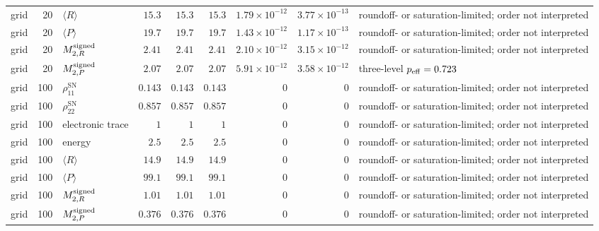 \documentclass[
  11pt,
  letterpaper,
  onehalfspacing,
  normalmargins,
  equalmargins,
  oneside
]{ut-thesis}
\begin{document}
\begin{landscape}
\begin{longtable}{l r l r r r r r L{0.18\textwidth}}
grid & 20 & $\langle R\rangle$ & $15.3$ & $15.3$ & $15.3$ & $1.79\times10^{-12}$ & $3.77\times10^{-13}$ & roundoff- or saturation-limited; order not interpreted \\
grid & 20 & $\langle P\rangle$ & $19.7$ & $19.7$ & $19.7$ & $1.43\times10^{-12}$ & $1.17\times10^{-13}$ & roundoff- or saturation-limited; order not interpreted \\
grid & 20 & $M^{\rm signed}_{2,R}$ & $2.41$ & $2.41$ & $2.41$ & $2.10\times10^{-12}$ & $3.15\times10^{-12}$ & roundoff- or saturation-limited; order not interpreted \\
grid & 20 & $M^{\rm signed}_{2,P}$ & $2.07$ & $2.07$ & $2.07$ & $5.91\times10^{-12}$ & $3.58\times10^{-12}$ & three-level $p_{\rm eff}=0.723$ \\
grid & 100 & $\rho_{11}^{\mathrm{SN}}$ & $0.143$ & $0.143$ & $0.143$ & $0$ & $0$ & roundoff- or saturation-limited; order not interpreted \\
grid & 100 & $\rho_{22}^{\mathrm{SN}}$ & $0.857$ & $0.857$ & $0.857$ & $0$ & $0$ & roundoff- or saturation-limited; order not interpreted \\
grid & 100 & electronic trace & $1$ & $1$ & $1$ & $0$ & $0$ & roundoff- or saturation-limited; order not interpreted \\
grid & 100 & energy & $2.5$ & $2.5$ & $2.5$ & $0$ & $0$ & roundoff- or saturation-limited; order not interpreted \\
grid & 100 & $\langle R\rangle$ & $14.9$ & $14.9$ & $14.9$ & $0$ & $0$ & roundoff- or saturation-limited; order not interpreted \\
grid & 100 & $\langle P\rangle$ & $99.1$ & $99.1$ & $99.1$ & $0$ & $0$ & roundoff- or saturation-limited; order not interpreted \\
grid & 100 & $M^{\rm signed}_{2,R}$ & $1.01$ & $1.01$ & $1.01$ & $0$ & $0$ & roundoff- or saturation-limited; order not interpreted \\
grid & 100 & $M^{\rm signed}_{2,P}$ & $0.376$ & $0.376$ & $0.376$ & $0$ & $0$ & roundoff- or saturation-limited; order not interpreted \\
\end{longtable}
\endgroup
\end{landscape}
\end{document}
